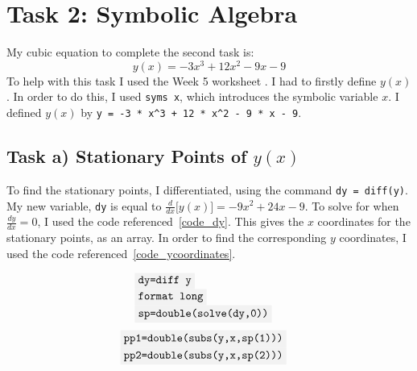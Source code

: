 \documentclass[10pt,a4paper]{article}
\newcommand{\code}[1]{\colorbox{light-gray}{\texttt{#1}}}
\begin{document}
	\section{Task 2: Symbolic Algebra} %
	My cubic equation to complete the second task is:
	\begin{equation} %
	\label{eq_cubic}
	y(x)=-3x^3+12x^2-9x-9
	\end{equation}
	To help with this task I used the Week 5 worksheet \cite{symbolicmath}. I had to firstly define $y(x)$. In order to do this, I used \code{syms x}, which introduces the symbolic variable $x$. I defined $y(x)$ by \code{y = -3 * x\^{}3 + 12 *  x\^{}2 - 9 * x - 9}.
	
	\subsection{Task a) Stationary Points of $y(x)$} %
	
	To find the stationary points, I differentiated, using the command \code{dy = diff(y)}. My new variable, \code{dy} is equal to $ \frac{d}{dx}\big[y(x)\big]=-9x^2+24x-9 $. To solve for when $\frac{dy}{dx}=0$, I used the code referenced~\ref{code_dy}. This gives the $x$ coordinates for the stationary points, as an array. In order to find the corresponding $y$ coordinates, I used the code referenced~\ref{code_ycoordinates}.
	
	\begin{equation} %
	\label{code_dy} 
	\begin{array}{ll}
	\code{dy=diff y}& \\
	\code{format long}& \\
	\code{sp=double(solve(dy,0))}&
	\end{array}
	\end{equation}
	\begin{equation} %
	\label{code_ycoordinates}
	\begin{array}{ll}
	\code{pp1=double(subs(y,x,sp(1)))}& \\
	\code{pp2=double(subs(y,x,sp(2)))}& 
	\end{array}
	\end{equation}
	
\end{document}
